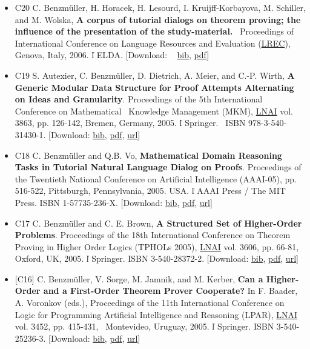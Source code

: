 \documentclass{article}
\newcommand{\tmtextbf}[1]{{\bfseries{#1}}}
\newenvironment{itemizedot}{\begin{itemize} \renewcommand{\labelitemi}{$\bullet$}\renewcommand{\labelitemii}{$\bullet$}\renewcommand{\labelitemiii}{$\bullet$}\renewcommand{\labelitemiv}{$\bullet$}}{\end{itemize}}
\begin{document}
\begin{itemizedot}
  \item [C20] C. Benzm\"uller, H. Horacek, H. Lesourd, I. Kruijff-Korbayova,
  M. Schiller, and M. Wolska, \tmtextbf{A corpus of tutorial dialogs on
  theorem proving; the influence of the presentation of the study-material.} \
  Proceedings of International Conference on Language Resources and Evaluation
  (\href{http://www.lrec-conf.org/lrec2006}{LREC}), Genova, Italy, 2006. 
  \v{l}  ELDA. {\color{grey} [Download: \ {\small
  \href{../papers/C20.bib}{bib}}, {\small \href{../papers/C20.pdf}{pdf}}]}
  
  \item [C19] S. Autexier, C. Benzm\"uller, D. Dietrich, A. Meier, and C.-P.
  Wirth, \tmtextbf{A Generic Modular Data Structure for Proof Attempts
  Alternating on Ideas and Granularity}. Proceedings of the 5th International
  Conference on Mathematical \ Knowledge Management (MKM),
  \href{http://www.springer.de/comp/lncs/}{LNAI} vol. 3863, pp. 126-142,
  Bremen, Germany, 2005.  \v{l}  Springer. \ ISBN 978-3-540-31430-1.
  {\color{grey} [Download: {\small \href{../papers/C19.bib}{bib}}, {\small
  \href{../papers/C19.pdf}{pdf}}, {\small
  \href{http://dx.doi.org/10.1007/11618027\_9}{url}}]}
  
  \item [C18] C. Benzm\"uller and Q.B. Vo, \tmtextbf{Mathematical Domain
  Reasoning Tasks in Tutorial Natural Language Dialog on Proofs}. Proceedings
  of the Twentieth National Conference on Artificial Intelligence (AAAI-05),
  pp. 516-522, Pittsburgh, Pennsylvania, 2005. USA.  \v{l}  AAAI Press / The
  MIT Press. ISBN 1-57735-236-X. {\color{grey} [Download: {\small
  \href{../papers/C18.bib}{bib}}, {\small
  \href{../papers/C18.pdf}{pdf}\href{http://springerlink.metapress.com/openurl.asp?genre=article\&id=FY754L8W5WMUUJEU}{}},
  {\small \href{}{url}}]}
  
  \item [C17] C. Benzm\"uller and C. E. Brown, \tmtextbf{A Structured Set of
  Higher-Order Problems}. Proceedings of the 18th International Conference on
  Theorem Proving in Higher Order Logics (TPHOLs 2005),
  \href{http://www.springer.de/comp/lncs/}{LNAI} vol. 3606, pp. 66-81, Oxford,
  UK, 2005.  \v{l}  Springer. ISBN 3-540-28372-2. {\color{grey} [Download:
  {\small \href{../papers/C17.bib}{bib}}, {\small
  \href{../papers/C17.pdf}{pdf}}, {\small
  \href{http://dx.doi.org/10.1007/11541868\_5}{url}}]}
  
  \item {\small [C16] C. Benzm\"uller, V. Sorge, M. Jamnik, and M. Kerber,
  \tmtextbf{Can a Higher-Order and a First-Order Theorem Prover Cooperate?}}
  {\small In F. Baader, A. Voronkov (eds.), Proceedings of the 11th
  International Conference on Logic for Programming Artificial Intelligence
  and Reasoning (LPAR), \href{http://www.springer.de/comp/lncs/}{LNAI} vol.
  3452, pp. 415-431, \ Montevideo, Uruguay, 2005.  \v{l}  Springer.} ISBN
  3-540-25236-3. {\color{grey} [Download: {\small
  \href{../papers/C16.bib}{bib}, \href{../papers/C16.pdf}{pdf}}, {\small
  \href{http://springerlink.metapress.com/openurl.asp?genre=article\&issn=0302-9743\&volume=3452\&spage=415}{url}}]}
  

\end{itemizedot}
\end{document}

